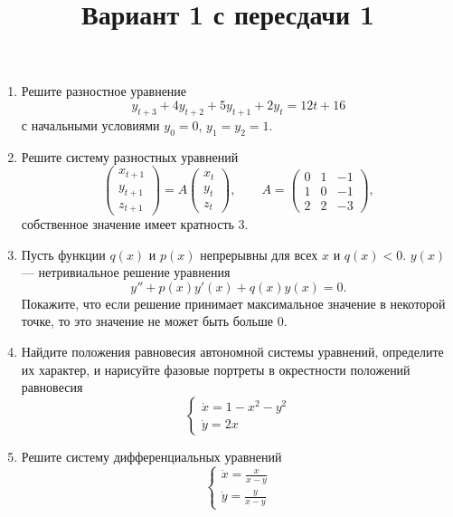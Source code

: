 \documentclass[12pt]{article}
\begin{document}
\title{Вариант 1 с пересдачи 1}
\author{}
\date{}
\maketitle

\begin{enumerate}
\item Решите разностное уравнение
\[
y_{t+3} + 4y_{t+2} + 5y_{t+1} + 2y_t = 12t + 16
\]
с начальными условиями $y_0 = 0$, $y_1 = y_2 = 1$.

\item Решите систему разностных уравнений
\[
\begin{pmatrix}
x_{t+1}\\[2pt]
y_{t+1}\\[2pt]
z_{t+1}
\end{pmatrix}
=
A
\begin{pmatrix}
x_{t}\\[2pt]
y_{t}\\[2pt]
z_{t}
\end{pmatrix},
\qquad
A=
\begin{pmatrix}
0 & 1 & -1 \\
1 & 0 & -1 \\
2 & 2 & -3
\end{pmatrix},
\]
собственное значение имеет кратность $3$.

\item Пусть функции $q(x)$ и $p(x)$ непрерывны для всех $x$ и $q(x) < 0$. $y(x)$ — нетривиальное решение уравнения
\[
y'' + p(x)y'(x) + q(x)y(x) = 0.
\]
Покажите, что если решение принимает максимальное значение в некоторой точке, то это значение не может быть больше 0.

\item Найдите положения равновесия автономной системы уравнений, определите их характер, и нарисуйте фазовые портреты в окрестности положений равновесия
\[
\begin{cases}
\dot{x} = 1 - x^2 - y^2 \\
\dot{y} = 2x
\end{cases}
\]

\item Решите систему дифференциальных уравнений
\[
\begin{cases}
\dot{x} = \frac{x}{x - y} \\
\dot{y} = \frac{y}{x - y}
\end{cases}
\]
\end{enumerate}
\end{document}
